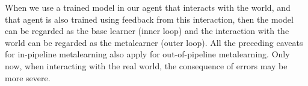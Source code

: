 When we use a trained model in our agent that interacts with the world, and that agent is also trained using feedback  from this interaction, then the model can be regarded as the base learner (inner loop) and the interaction with the world can be regarded as the metalearner (outer loop). All the preceding caveats for in-pipeline metalearning also apply for out-of-pipeline metalearning. Only now, when interacting with the real world, the consequence of errors may be more severe.






